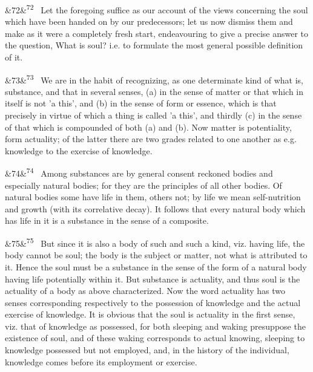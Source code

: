 \documentclass[12pt]{article}
\newcommand{\para}[1][]{\par\noindent\ifx&#1&\else\textsuperscript{\footnotesize #1}~\fi}
\begin{document}
\para[72] Let the foregoing suffice as our account of the views concerning the soul which have been handed on by our predecessors; let us now dismiss them and make as it were a completely fresh start, endeavouring to give a precise answer to the question, What is soul? i.e. to formulate the most general possible definition of it.

\para[73] We are in the habit of recognizing, as one determinate kind of what is, substance, and that in several senses, (a) in the sense of matter or that which in itself is not 'a this', and (b) in the sense of form or essence, which is that precisely in virtue of which a thing is called 'a this', and thirdly (c) in the sense of that which is compounded of both (a) and (b). Now matter is potentiality, form actuality; of the latter there are two grades related to one another as e.g. knowledge to the exercise of knowledge.

\para[74] Among substances are by general consent reckoned bodies and especially natural bodies; for they are the principles of all other bodies. Of natural bodies some have life in them, others not; by life we mean self-nutrition and growth (with its correlative decay). It follows that every natural body which has life in it is a substance in the sense of a composite.

\para[75] But since it is also a body of such and such a kind, viz. having life, the body cannot be soul; the body is the subject or matter, not what is attributed to it. Hence the soul must be a substance in the sense of the form of a natural body having life potentially within it. But substance is actuality, and thus soul is the actuality of a body as above characterized. Now the word actuality has two senses corresponding respectively to the possession of knowledge and the actual exercise of knowledge. It is obvious that the soul is actuality in the first sense, viz. that of knowledge as possessed, for both sleeping and waking presuppose the existence of soul, and of these waking corresponds to actual knowing, sleeping to knowledge possessed but not employed, and, in the history of the individual, knowledge comes before its employment or exercise.
\end{document}
